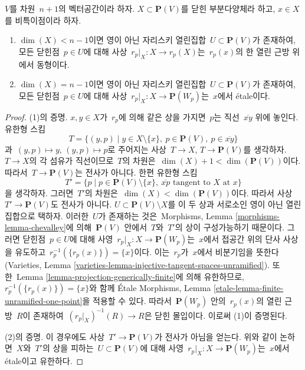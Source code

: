 \begin{lemma}
\label{lemma-projection-generically-immersion}
$V$를 차원\  $n + 1$의 벡터공간이라 하자.
$X \subset \mathbf{P}(V)$를 닫힌 부분다양체라 하고,
$x \in X$를 비특이점이라 하자.
\begin{enumerate}
\item $\dim(X) < n - 1$이면 영이 아닌 자리스키 열린집합\ 
$U \subset \mathbf{P}(V)$가 존재하여, 모든 닫힌점\  $p \in U$에 대해
사상\  $r_p|_X : X \to r_p(X)$는\  $r_p(x)$의 한 열린 근방 위에서 동형이다.
\item $\dim(X) = n - 1$이면 영이 아닌 자리스키 열린집합\ 
$U \subset \mathbf{P}(V)$가 존재하여, 모든 닫힌점\  $p \in U$에 대해
사상\  $r_p|_X : X \to \mathbf{P}(W_p)$는\  $x$에서 \'etale이다.
\end{enumerate}
\end{lemma}

\begin{proof}
(1)의 증명. $x, y \in X$가\  $r_p$에 의해 같은 상을 가지면\  $p$는 직선\ 
$\overline{xy}$ 위에 놓인다. 유한형 스킴
$$
T = \{(y, p) \mid
y \in X \setminus \{x\},\ p \in \mathbf{P}(V),\ p \in \overline{xy}\}
$$
과\  $(y, p) \mapsto y$, $(y, p) \mapsto p$로 주어지는 사상\ 
$T \to X$, $T \to \mathbf{P}(V)$를 생각하자.
$T \to X$의 각 섬유가 직선이므로\ 
$T$의 차원은\  $\dim(X) + 1 < \dim(\mathbf{P}(V))$이다.
따라서\  $T \to \mathbf{P}(V)$는 전사가 아니다. 한편 유한형 스킴
$$
T' = \{p \mid
p \in \mathbf{P}(V) \setminus \{x\},
\ \overline{xp}\text{ tangent to }X\text{ at }x\}
$$
을 생각하자. 그러면\  $T'$의 차원은\ 
$\dim(X) < \dim(\mathbf{P}(V))$이다. 따라서 사상\ 
$T' \to \mathbf{P}(V)$도 전사가 아니다.
$U \subset \mathbf{P}(V) \setminus X$를 이 두 상과 서로소인 영이 아닌
열린집합으로 택하자. 이러한\  $U$가 존재하는 것은\  Morphisms, Lemma
\ref{morphisms-lemma-chevalley}에 의해\  $\mathbf{P}(V)$ 안에서\  $T$와\  $T'$의
상이 구성가능하기 때문이다. 그러면 닫힌점\  $p \in U$에 대해 사영\ 
$r_p|_X : X \to \mathbf{P}(W_p)$는\  $x$에서 접공간 위의 단사 사상을
유도하고\  $r_p^{-1}(\{r_p(x)\}) = \{x\}$이다.
이는\  $r_p$가\  $x$에서 비분기임을 뜻한다(Varieties, Lemma
\ref{varieties-lemma-injective-tangent-spaces-unramified}). 또한\ 
Lemma \ref{lemma-projection-generically-finite}에 의해 유한하므로,
$r_p^{-1}(\{r_p(x)\}) = \{x\}$와 함께 \'Etale Morphisms, Lemma
\ref{etale-lemma-finite-unramified-one-point}을 적용할 수 있다. 따라서\ 
$\mathbf{P}(W_p)$ 안의\  $r_p(x)$의 열린 근방\  $R$이 존재하여\ 
$(r_p|_X)^{-1}(R) \to R$은 닫힌 몰입이다. 이로써 (1)이 증명된다.

\medskip\noindent
(2)의 증명. 이 경우에도 사상\  $T' \to \mathbf{P}(V)$가 전사가 아님을
얻는다. 위와 같이 논하면\  $X$와\  $T'$의 상을 피하는\ 
$U \subset \mathbf{P}(V)$에 대해 사영\ 
$r_p|_X : X \to \mathbf{P}(W_p)$는\  $x$에서 \'etale이고 유한하다.
\end{proof}

